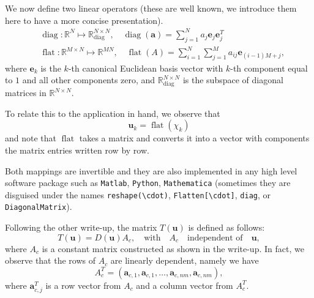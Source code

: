 \documentclass[12pt]{amsart}
\theoremstyle{definition}
\begin{document}
We now define two linear operators (these are well known, we introduce them here to have a more concise presentation).
\begin{equation}
\begin{aligned}
&\operatorname{diag}: 
\mathds{R}^{N}\mapsto \mathds{R}^{N\times N}_{\operatorname{diag}},\quad\operatorname{diag}(\bm a)= \sum_{j=1}^N a_j \bm e_j\bm e_j^T\\
&\operatorname{flat}:\mathds{R}^{M\times N}\mapsto \mathds{R}^{MN},\quad
\operatorname{flat}(A)=\sum_{i=1}^N\sum_{j=1}^M a_{ij}\bm e_{(i-1)M+j},
\end{aligned}
\end{equation}
where $\bm{e}_k$ is the $k$-th canonical Euclidean basis vector with $k$-th component equal to $1$ and all other components zero, and $\mathds{R}^{N\times N}_{\operatorname{diag}}$ 
is the subspace of diagonal matrices in $\mathds{R}^{N\times N}$. 

To relate this to the application in hand, we observe that 
\[
\bm{u}_k=\operatorname{flat}(\chi_k)
\]
and note that $\operatorname{flat}$ takes a matrix and converts it into a vector with components the matrix entries written row by row. 

Both mappings are invertible and they are also implemented in any high level software package such as \verb|Matlab|, \verb|Python|, \verb|Mathematica| (sometimes they are disguised under the names \verb|reshape(\cdot)|, \verb|Flatten[\cdot]|, \verb|diag|, or \verb|DiagonalMatrix|).

Following the other write-up, the matrix $T(\bm{u})$ is defined as follows:
\begin{equation}
  T(\bm{u})=D(\bm u) A_c, \quad\mbox{with}\quad A_c \quad\mbox{independent of}\quad\bm{u},
\end{equation}
where $A_c$ is a constant matrix constructed as shown in the write-up. In fact, we observe that the rows of  $A_c$ are linearly dependent, namely we have
\begin{equation}
A_c^T=(\bm{a}_{c,1},\bm{a}_{c,1},\ldots,\bm{a}_{c,nm},\bm{a}_{c,nm}),
\end{equation}
where $\bm{a}_{c,j}^T$ is a row vector from $A_c$ and a column vector from $A_c^T$. 
\end{document}
